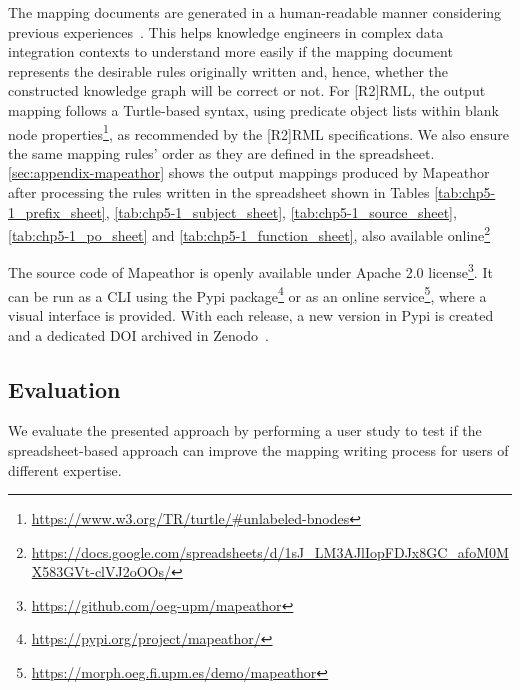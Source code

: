 The mapping documents are generated in a human-readable manner considering previous experiences~\cite{chaves2022systematic,corcho2021high,chaves2020bench}.
This helps knowledge engineers in complex data integration contexts to understand more easily if the mapping document represents the desirable rules originally written and, hence, whether the constructed knowledge graph will be correct or not. 
For [R2]RML, the output mapping follows a Turtle-based syntax, using predicate object lists within blank node properties\footnote{\url{https://www.w3.org/TR/turtle/\#unlabeled-bnodes}}, as recommended by the [R2]RML specifications.
We also ensure the same mapping rules' order as they are defined in the spreadsheet.
\cref{sec:appendix-mapeathor} shows the output mappings produced by Mapeathor after processing the rules written in the spreadsheet shown in Tables \ref{tab:chp5-1_prefix_sheet}, \ref{tab:chp5-1_subject_sheet}, \ref{tab:chp5-1_source_sheet}, \ref{tab:chp5-1_po_sheet} and \ref{tab:chp5-1_function_sheet}, also available online\footnote{\url{https://docs.google.com/spreadsheets/d/1sJ_LM3AJlIopFDJx8GC_afoM0MX583GVt-clVJ2oOOs/}}




The source code of Mapeathor is openly available under Apache 2.0 license\footnote{\url{https://github.com/oeg-upm/mapeathor}}. It can be run as a CLI using the Pypi package\footnote{\url{https://pypi.org/project/mapeathor/}} or as an online service\footnote{\url{https://morph.oeg.fi.upm.es/demo/mapeathor}}, where a visual interface is provided. With each release, a new version in Pypi is created and a dedicated DOI archived in Zenodo~\cite{iglesias-molina_2023_5973906}. 




\subsection{Evaluation}
We evaluate the presented approach by performing a user study to test %
if the spreadsheet-based approach can improve the mapping writing process for users of different expertise. 

